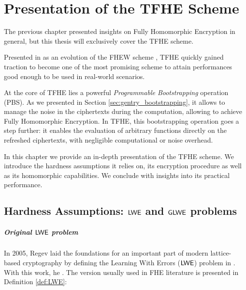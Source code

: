 
\chapter{Presentation of the TFHE Scheme}

The previous chapter presented insights on Fully Homomorphic Encryption in general, but this thesis will exclusively cover the TFHE scheme.

Presented in \cite{JC:CGGI20, these_chillotti} as an evolution of the FHEW scheme \cite{EC:DucMic15}, TFHE quickly gained traction to become one of the most promising scheme to attain performances good enough to be  used in real-world scenarios. 

At the core of TFHE lies a powerful \textit{Programmable Bootstrapping} operation (PBS). As we presented in Section \ref{sec:gentry_bootstrapping}, it allows to manage the noise in the ciphertexts during the computation, allowing to achieve Fully Homomorphic Encryption. In TFHE, this bootstrapping operation goes a step further: it enables the evaluation of arbitrary functions directly on the refreshed ciphertexts, with negligible computational or noise overhead.

In this chapter we provide an in-depth presentation of the TFHE scheme. We introduce the hardness assumptions it relies on, its encryption procedure as well as its homomorphic capabilities. We conclude with insights into its practical performance.

\section{Hardness Assumptions: $\textsf{LWE}$ and $\textsf{GLWE}$ problems}
\label{sec:hardness_assumptions}


\paragraph{Original $\textsf{LWE}$ problem}

In 2005, Regev laid the foundations for an important part of modern lattice-based cryptography by defining the Learning With Errors ($\textsf{LWE}$) problem in \cite{regev_lwe}. With this work, he . The version usually used in FHE literature is presented in Definition \ref{def:LWE}:



